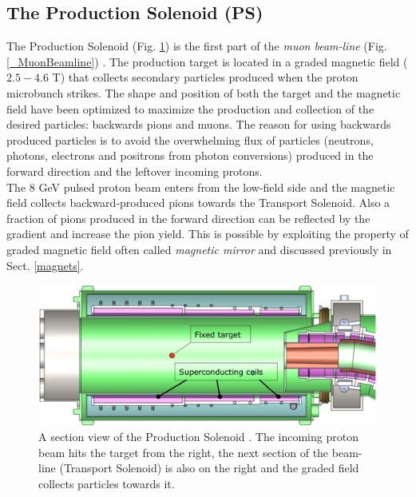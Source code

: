 \documentclass[12pt,a4paper,openright, oneside, titlepage]{book} %
\begin{document}
\subsection{The Production Solenoid (PS)}
The Production Solenoid (Fig. \ref{_PS}) is the first part of the \textit{muon beam-line} (Fig. \ref{_MuonBeamline}) \cite{PS}. 
The production target is located in a graded magnetic field ($2.5 - 4.6$ T) that collects secondary particles produced when the proton microbunch strikes. The shape and position of both the target and the magnetic field have been optimized to maximize the production and collection of the desired particles: backwards pions and muons. 
The reason for using backwards produced particles is to avoid the overwhelming flux of particles 
(neutrons, photons, electrons and positrons from photon conversions) 
produced in the forward direction and the leftover incoming protons.\\
The 8 GeV pulsed proton beam enters from the low-field side and the magnetic field collects backward-produced pions towards the Transport Solenoid. 
Also a fraction of pions produced in the forward direction can be reflected by the gradient and  increase the pion yield. 
This is possible by exploiting the property of graded magnetic field often called \textit{magnetic mirror} 
and discussed previously in Sect. \ref{magnets}.

\begin{figure}[h!]
\centering
\includegraphics[scale=0.4]{PS}
\caption{A section view of the Production Solenoid \cite{PS}. 
The incoming proton beam hits the target from the right, 
the next section of the beam-line (Transport Solenoid) is also on the right and the graded field collects particles towards it.}
\label{_PS}
\end{figure}
\end{document}
